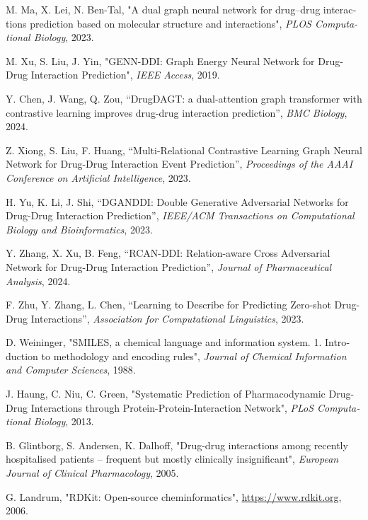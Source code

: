 \begin{thebibliography}{99}
\begin{latin}
M. Ma, X. Lei, N. Ben-Tal, "A dual graph neural network for drug–drug interactions prediction based on molecular structure and interactions", \textit{PLOS Computational Biology}, 2023.

M. Xu, S. Liu, J. Yin, "GENN-DDI: Graph Energy Neural Network for Drug-Drug Interaction Prediction", \textit{IEEE Access}, 2019.

Y. Chen, J. Wang, Q. Zou, “DrugDAGT: a dual-attention graph transformer with contrastive learning improves drug-drug interaction prediction”, \textit{BMC Biology}, 2024.

Z. Xiong, S. Liu, F. Huang, “Multi-Relational Contrastive Learning Graph Neural Network for Drug-Drug Interaction Event Prediction”, \textit{Proceedings of the AAAI Conference on Artificial Intelligence}, 2023.

H. Yu, K. Li, J. Shi, “DGANDDI: Double Generative Adversarial Networks for Drug-Drug Interaction Prediction”, \textit{IEEE/ACM Transactions on Computational Biology and Bioinformatics}, 2023.

Y. Zhang, X. Xu, B. Feng, “RCAN-DDI: Relation-aware Cross Adversarial Network for Drug-Drug Interaction Prediction”, \textit{Journal of Pharmaceutical Analysis}, 2024.

F. Zhu, Y. Zhang, L. Chen, “Learning to Describe for Predicting Zero-shot Drug-Drug Interactions”, \textit{Association for Computational Linguistics}, 2023.

D. Weininger, "SMILES, a chemical language and information system. 1. Introduction to methodology and encoding rules", \textit{Journal of Chemical Information and Computer Sciences}, 1988.

J. Haung, C. Niu, C. Green, "Systematic Prediction of Pharmacodynamic Drug-Drug Interactions through Protein-Protein-Interaction Network", \textit{PLoS Computational Biology}, 2013.

B. Glintborg, S. Andersen, K. Dalhoff, "Drug-drug interactions among recently hospitalised patients – frequent but mostly clinically insignificant", \textit{European Journal of Clinical Pharmacology}, 2005.

G. Landrum, "RDKit: Open-source cheminformatics", \url{https://www.rdkit.org}, 2006.


\end{latin}
\end{thebibliography}
